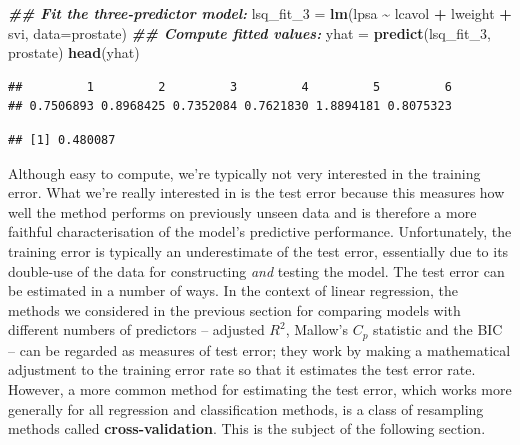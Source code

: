 \documentclass[
]{article}
\newenvironment{Shaded}{\begin{snugshade}}{\end{snugshade}}
\newcommand{\AttributeTok}[1]{\textcolor[rgb]{0.13,0.29,0.53}{#1}}
\newcommand{\DecValTok}[1]{\textcolor[rgb]{0.00,0.00,0.81}{#1}}
\newcommand{\DocumentationTok}[1]{\textcolor[rgb]{0.56,0.35,0.01}{\textbf{\textit{#1}}}}
\newcommand{\FunctionTok}[1]{\textcolor[rgb]{0.13,0.29,0.53}{\textbf{#1}}}
\newcommand{\NormalTok}[1]{#1}
\newcommand{\OtherTok}[1]{\textcolor[rgb]{0.56,0.35,0.01}{#1}}
\newcommand{\SpecialCharTok}[1]{\textcolor[rgb]{0.81,0.36,0.00}{\textbf{#1}}}
\begin{document}
\begin{Shaded}
\begin{Highlighting}[]
\DocumentationTok{\#\# Fit the three{-}predictor model:}
\NormalTok{lsq\_fit\_3 }\OtherTok{=} \FunctionTok{lm}\NormalTok{(lpsa }\SpecialCharTok{\textasciitilde{}}\NormalTok{ lcavol }\SpecialCharTok{+}\NormalTok{ lweight }\SpecialCharTok{+}\NormalTok{ svi, }\AttributeTok{data=}\NormalTok{prostate)}
\DocumentationTok{\#\# Compute fitted values:}
\NormalTok{yhat }\OtherTok{=} \FunctionTok{predict}\NormalTok{(lsq\_fit\_3, prostate)}
\FunctionTok{head}\NormalTok{(yhat)}
\end{Highlighting}
\end{Shaded}

\begin{verbatim}
##         1         2         3         4         5         6 
## 0.7506893 0.8968425 0.7352084 0.7621830 1.8894181 0.8075323
\end{verbatim}

\begin{Shaded}
\end{Shaded}

\begin{verbatim}
## [1] 0.480087
\end{verbatim}

Although easy to compute, we're typically not very interested in the
training error. What we're really interested in is the test error
because this measures how well the method performs on previously unseen
data and is therefore a more faithful characterisation of the model's
predictive performance. Unfortunately, the training error is typically
an underestimate of the test error, essentially due to its double-use of
the data for constructing \emph{and} testing the model. The test error
can be estimated in a number of ways. In the context of linear
regression, the methods we considered in the previous section for
comparing models with different numbers of predictors -- adjusted
\(R^2\), Mallow's \(C_p\) statistic and the BIC -- can be regarded as
measures of test error; they work by making a mathematical adjustment to
the training error rate so that it estimates the test error rate.
However, a more common method for estimating the test error, which works
more generally for all regression and classification methods, is a class
of resampling methods called \textbf{cross-validation}. This is the
subject of the following section.
\end{document}
